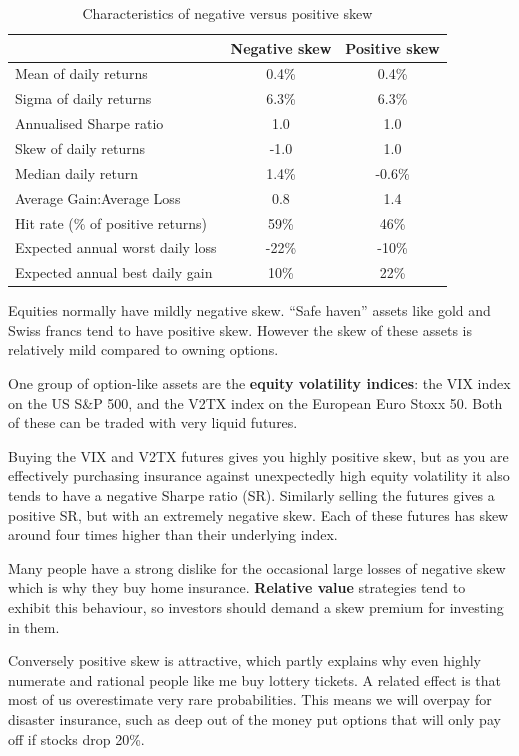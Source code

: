 \begin{table}[htbp] \centering \caption{Characteristics of negative versus positive skew} \begin{tabular}{@{} lcc@{}}
\toprule
& \textbf{Negative skew} & \textbf{Positive skew} \\
\midrule
Mean of daily returns & 0.4\% & 0.4\% \\
Sigma of daily returns & 6.3\% & 6.3\% \\
Annualised Sharpe ratio & 1.0 & 1.0 \\
Skew of daily returns & -1.0 & 1.0 \\
Median daily return & 1.4\% & -0.6\% \\
Average Gain:Average Loss & 0.8 & 1.4 \\
Hit rate (\% of positive returns) & 59\% & 46\% \\
Expected annual worst daily loss & -22\% & -10\% \\
Expected annual best daily gain & 10\% & 22\% \\
\bottomrule
\end{tabular}
\end{table}

Equities normally have mildly negative skew. ``Safe haven'' assets like gold and Swiss francs tend to have positive skew. However the skew of these assets is relatively mild compared to owning options.

One group of option-like assets are the \textbf{equity volatility indices}: the VIX index on the US S\&P 500, and the V2TX index on the European Euro Stoxx 50. Both of these can be traded with very liquid futures.

Buying the VIX and V2TX futures gives you highly positive skew, but as you are effectively purchasing insurance against unexpectedly high equity volatility it also tends to have a negative Sharpe ratio (SR). Similarly selling the futures gives a positive SR, but with an extremely negative skew. Each of these futures has skew around four times higher than their underlying index.

Many people have a strong dislike for the occasional large losses of negative skew which is why they buy home insurance. \textbf{Relative value} strategies tend to exhibit this behaviour, so investors should demand a skew premium for investing in them.

Conversely positive skew is attractive, which partly explains why even highly numerate and rational people like me buy lottery tickets. A related effect is that most of us overestimate very rare probabilities. This means we will overpay for disaster insurance, such as deep out of the money put options that will only pay off if stocks drop 20\%.

